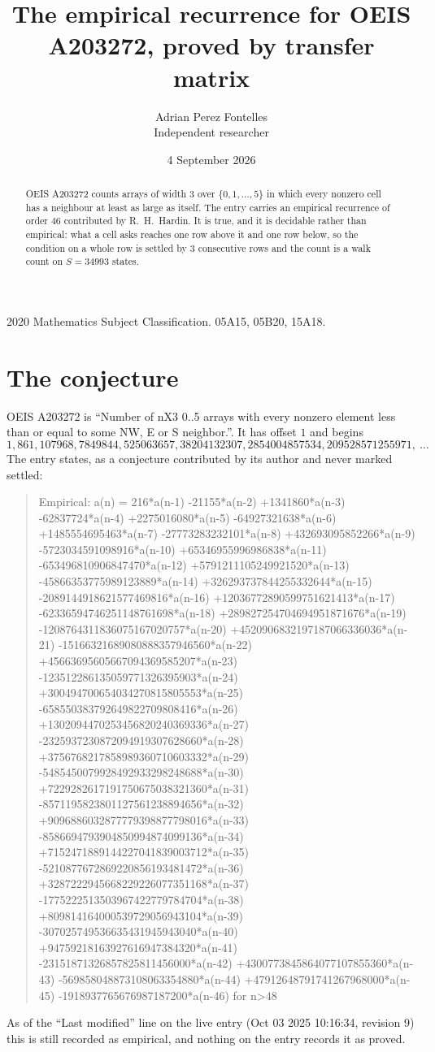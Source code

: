 \documentclass[11pt,a4paper]{article}
\title{The empirical recurrence for OEIS A203272, proved by transfer matrix}
\author{Adrian Perez Fontelles\\ \small Independent researcher}
\date{4 September 2026}
\theoremstyle{plain}
\theoremstyle{definition}
\begin{document}
\maketitle

\begin{abstract}
OEIS A203272 counts arrays of width $3$ over $\{0,1,\dots,5\}$ in which every nonzero cell has a neighbour at least as large as itself. The entry carries an
empirical recurrence of order $46$ contributed by R.~H.~Hardin. It is true, and it is
decidable rather than empirical: what a cell asks reaches one row above it and one row below, so the
condition on a whole row is settled by $3$ consecutive rows and the count is a walk
count on $S=34993$ states.
\end{abstract}

\noindent\small 2020 Mathematics Subject Classification. 05A15, 05B20, 15A18.\normalsize

\section{The conjecture}

OEIS A203272 is ``Number of nX3 0..5 arrays with every nonzero element less than or equal to some NW, E or S neighbor.''. It has offset $1$ and begins
\[
1, 861, 107968, 7849844, 525063657, 38204132307, 2854004857534, 209528571255971,\ \dots
\]
The entry states, as a conjecture contributed by its author and never marked settled:
\begin{quote}
Empirical: a(n) = 216*a(n-1) -21155*a(n-2) +1341860*a(n-3) -62837724*a(n-4) +2275016080*a(n-5) -64927321638*a(n-6) +1485554695463*a(n-7) -27773283232101*a(n-8) +432693095852266*a(n-9) -5723034591098916*a(n-10) +65346955996986838*a(n-11) -653496810906847470*a(n-12) +5791211105249921520*a(n-13) -45866353775989123889*a(n-14) +326293737844255332644*a(n-15) -2089144918621577469816*a(n-16) +12036772890599751621413*a(n-17) -62336594746251148761698*a(n-18) +289827254704694951871676*a(n-19) -1208764311836075167020757*a(n-20) +4520906832197187066336036*a(n-21) -15166321689080888357946560*a(n-22) +45663695605667094369585207*a(n-23) -123512286135059771326395903*a(n-24) +300494700654034270815805553*a(n-25) -658550383792649822709808416*a(n-26) +1302094470253456820240369336*a(n-27) -2325937230872094919307628660*a(n-28) +3756768217858989360710603332*a(n-29) -5485450079928492933298248688*a(n-30) +7229282617191750675038321360*a(n-31) -8571195823801127561238894656*a(n-32) +9096886032877779398877798016*a(n-33) -8586694793904850994874099136*a(n-34) +7152471889144227041839003712*a(n-35) -5210877672869220856193481472*a(n-36) +3287222945668229226077351168*a(n-37) -1775222513503967422779784704*a(n-38) +809814164000539729056943104*a(n-39) -307025749536635431945943040*a(n-40) +94759218163927616947384320*a(n-41) -23151871326857825811456000*a(n-42) +4300773845864077107855360*a(n-43) -569858048873108063354880*a(n-44) +47912648791741267968000*a(n-45) -1918937765676987187200*a(n-46) for n>48
\end{quote}
As of the ``Last modified'' line on the live entry (Oct 03 2025 10:16:34, revision 9) this is still
recorded as empirical, and nothing on the entry records it as proved.
\end{document}
